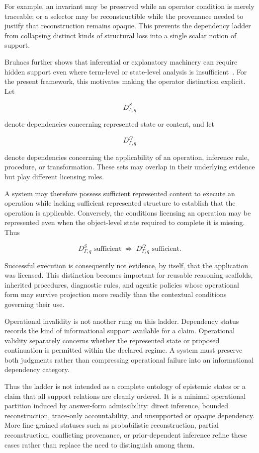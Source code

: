 \documentclass[11pt]{article}
\begin{document}
For example, an invariant may be preserved while an operator condition is merely traceable; or a selector may be reconstructible while the provenance needed to justify that reconstruction remains opaque. This prevents the dependency ladder from collapsing distinct kinds of structural loss into a single scalar notion of support.

Bruhacs further shows that inferential or explanatory machinery can require hidden support even where term-level or state-level analysis is insufficient~\cite{Bruhacs2026Hidden}. For the present framework, this motivates making the operator distinction explicit. Let

\[
D^{S}_{\Gamma,q}
\]

denote dependencies concerning represented state or content, and let

\[
D^{\Omega}_{\Gamma,q}
\]

denote dependencies concerning the applicability of an operation, inference rule, procedure, or transformation. These sets may overlap in their underlying evidence but play different licensing roles.

A system may therefore possess sufficient represented content to execute an operation while lacking sufficient represented structure to establish that the operation is applicable. Conversely, the conditions licensing an operation may be represented even when the object-level state required to complete it is missing. Thus

\[
D^{S}_{\Gamma,q}\text{ sufficient}
\;\not\Rightarrow\;
D^{\Omega}_{\Gamma,q}\text{ sufficient}.
\]

Successful execution is consequently not evidence, by itself, that the application was licensed. This distinction becomes important for reusable reasoning scaffolds, inherited procedures, diagnostic rules, and agentic policies whose operational form may survive projection more readily than the contextual conditions governing their use.

Operational invalidity is not another rung on this ladder. Dependency status records the kind of informational support available for a claim. Operational validity separately concerns whether the represented state or proposed continuation is permitted within the declared regime. A system must preserve both judgments rather than compressing operational failure into an informational dependency category.

Thus the ladder is not intended as a complete ontology of epistemic states or a claim that all support relations are cleanly ordered. It is a minimal operational partition induced by answer-form admissibility: direct inference, bounded reconstruction, trace-only accountability, and unsupported or opaque dependency. More fine-grained statuses such as probabilistic reconstruction, partial reconstruction, conflicting provenance, or prior-dependent inference refine these cases rather than replace the need to distinguish among them.
\end{document}
